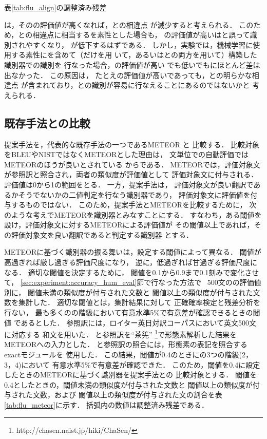 \documentclass[japanese]{jnlp_1.4}
\newcommand{\AL}{}
\newcommand{\NAL}{}
\newcommand{\FLU}{}
\newcommand{\HUM}{}
\newcommand{\MT}{}
\newcommand{\ACC}{}
\newcommand{\MTS}{}
\begin{document}
\begin{table}[t]
\caption{表\ref{tab:flu_align}の調整済み残差}
\label{tab:flu_align_zansa}

\end{table}

{\MT}は，その{\FLU}の評価値が高くなれば，{\HUM}との相違点
が減少すると考えられる．
このため，{\HUM}と{\MT}の相違点に相当する{\NAL}を素性とした場合も，
{\FLU}の評価値が高い{\MT}は{\HUM}と誤って識別されやすくなり，
{\ACC}が低下するはずである．
しかし，実験では，機械学習に使用する素性に{\NAL}を含めて（{\NAL}だけを用
いて，あるいは{\NAL}と{\AL}の両方を用いて）構築した識別器で{\MT}の識別を
行なった場合，{\FLU}の評価値が高い
{\MT}でも低い{\MT}でも{\ACC}にほとんど差は出なかった．
この原因は，
たとえ{\FLU}の評価値が高い{\MT}であっても，{\HUM}との明らかな相違点
が含まれており，{\HUM}との識別が容易に行なえることにあるのではないかと
考えられる．



\subsection{既存手法との比較}
\label{sec:experiment:accuracy_hum_eval_meteor}


提案手法を，代表的な既存手法の一つであるMETEOR \cite{Banerjee05}と
比較する．
比較対象をBLEUやNISTではなくMETEORとした理由は，
文単位での自動評価ではMETEORのほうが良いとされている
からである\cite{Banerjee05}．
METEORでは，評価対象文が参照訳と照合され，両者の類似度が評価値として
評価対象文に付与される．
評価値は0から1の範囲をとる．
一方，提案手法は，
評価対象文が良い翻訳であるかそうでないかの二値判定を行なう識別器であり，
評価対象文に評価値を付与するものではない．
このため，提案手法とMETEORを比較するために，
次のような考えでMETEORを識別器とみなすことにする．
すなわち，ある閾値を設け，評価対象文に対するMETEORによる評価値が
その閾値以上であれば，その評価対象文を良い翻訳であると判定する識別器
とする．

METEORに基づく識別器の振る舞いは，設定する閾値によって異なる．
閾値が高過ぎれば厳し過ぎる評価尺度になり，
逆に，低過ぎれば甘過ぎる評価尺度になる．
適切な閾値を決定するために，
閾値を0.1から0.9まで0.1刻みで変化させて，
\ref{sec:experiment:accuracy_hum_eval}節で行なった方法で
{\MTS}~500文の{\FLU}の評価値別に，
閾値未満の類似度が付与された文数と
閾値以上の類似度が付与された文数を集計した．
適切な閾値とは，集計結果に対して
正確確率検定と残差分析を行ない，
最も多くの{\FLU}の階級において有意水準5\%で有意差が確認できるときの閾値
であるとした．
参照訳には，ロイター英日対訳コーパスにおいて英文500文に対応する
和文を用いた．
{\MTS}と参照訳を``茶筅''
\footnote{http://chasen.naist.jp/hiki/ChaSen/}で形態素解析した結果を
METEORへの入力とした．
{\MTS}と参照訳の照合には，形態素の表記を照合するexactモジュールを
使用した．
この結果，閾値が0.4のときに{\FLU}の3つの階級(2，3，4)において
有意水準5\%で有意差が確認できた．
このため，閾値を0.4に設定したときのMETEORに基づく識別器を提案手法との
比較対象とする．
閾値を0.4としたときの，閾値未満の類似度が付与された文数と
閾値以上の類似度が付与された文数，および
閾値以上の類似度が付与された文の割合を表\ref{tab:flu_meteor}に示す．
括弧内の数値は調整済み残差である．
\end{document}
